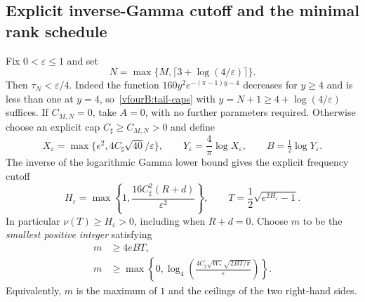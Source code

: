 \subsection{Explicit inverse-Gamma cutoff and the minimal rank schedule}
\label{vfourB:schedule}

Fix $0<\varepsilon\le1$ and set
\begin{equation}\label{vfourB:integer-cutoff}
 N=\max\{M,\lceil3+\log(4/\varepsilon)\rceil\}.
\end{equation}
Then $\tau_N<\varepsilon/4$. Indeed the function
$160y^2e^{-(\pi-1)y-4}$ decreases for $y\ge4$ and is less than one at
$y=4$, so~\eqref{vfourB:tail-caps} with
$y=N+1\ge4+\log(4/\varepsilon)$ suffices.
If $C_{M,N}=0$, take $A=0$, with no further parameters required.
Otherwise choose an explicit cap $C_\sharp\ge C_{M,N}>0$ and define
\begin{equation}\label{vfourB:spatial-cutoff}
 X_\varepsilon=\max\{e^2,4C_\sharp\sqrt{40}/\varepsilon\},\qquad
 Y_\varepsilon=\frac4\pi\log X_\varepsilon,\qquad
 B=\tfrac12\log Y_\varepsilon.
\end{equation}
The inverse of the logarithmic Gamma lower bound gives the explicit
frequency cutoff
\begin{equation}\label{vfourB:inverse-gamma}
 H_\varepsilon=
 \max\left\{1,\frac{16C_\sharp^2(R+d)}{\varepsilon^2}\right\},\qquad
 T=\frac12\sqrt{e^{2H_\varepsilon}-1}.
\end{equation}
In particular $\nu(T)\ge H_\varepsilon>0$, including when $R+d=0$.
Choose $m$ to be the \emph{smallest positive integer} satisfying
\begin{equation}\label{vfourB:minimal-m}
 \begin{split}
 m&\ge4eBT,\\
 m&\ge\max\left\{0,
   \log_4\!\left(
       \frac{4C_\sharp\sqrt{W_*}\sqrt{2BT/\pi}}{\varepsilon}
           \right)\right\}.
 \end{split}
\end{equation}
Equivalently, $m$ is the maximum of $1$ and the ceilings of the two
right-hand sides.

